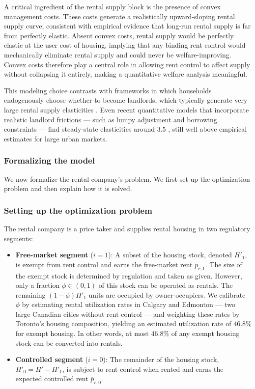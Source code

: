 \documentclass[parskip=full]{article}
\begin{document}
A critical ingredient of the rental supply block is the presence of convex management costs. These costs generate a realistically upward-sloping rental supply curve, consistent with empirical evidence that long-run rental supply is far from perfectly elastic. Absent convex costs, rental supply would be perfectly elastic at the user cost of housing, implying that any binding rent control would mechanically eliminate rental supply and could never be welfare-improving. Convex costs therefore play a central role in allowing rent control to affect supply without collapsing it entirely, making a quantitative welfare analysis meaningful.

This modeling choice contrasts with frameworks in which households endogenously choose whether to become landlords, which typically generate very large rental supply elasticities \citep{rs-2023}. Even recent quantitative models that incorporate realistic landlord frictions — such as lumpy adjustment and borrowing constraints — find steady-state elasticities around 3.5 \citep{araujo2024}, still well above empirical estimates for large urban markets.

\subsubsection{Formalizing the model}

We now formalize the rental company’s problem. We first set up the optimization problem and then explain how it is solved.

\subsubsection*{Setting up the optimization problem}

The rental company is a price taker and supplies rental housing in two regulatory segments:

\begin{itemize}
    \item \textbf{Free-market segment} ($i=1$): A subset of the housing stock, denoted $H'_1$, is exempt from rent control and earns the free-market rent $p_{r,1}$. The size of the exempt stock is determined by regulation and taken as given. However, only a fraction $\phi \in (0,1)$ of this stock can be operated as rentals. The remaining $(1-\phi)H'_1$ units are occupied by owner-occupiers. We calibrate $\phi$ by estimating rental utilization rates in Calgary and Edmonton — two large Canadian cities without rent control — and weighting these rates by Toronto’s housing composition, yielding an estimated utilization rate of $46.8\%$ for exempt housing. In other words, at most $46.8\%$ of any exempt housing stock can be converted into rentals.
    
    \item \textbf{Controlled segment} ($i=0$): The remainder of the housing stock, $H'_0 = H' - H'_1$, is subject to rent control when rented and earns the expected controlled rent $\overline{p}_{r,0}$.
\end{itemize}
\end{document}
